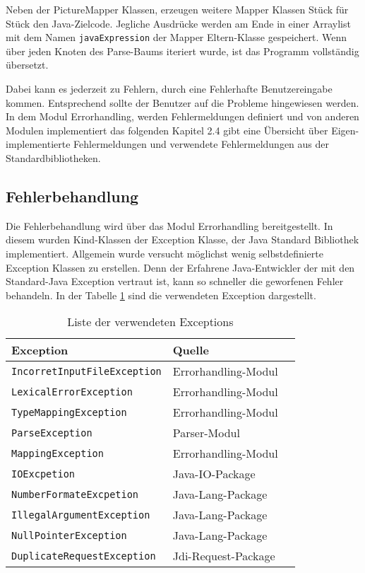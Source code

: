 Neben der PictureMapper Klassen, erzeugen weitere Mapper Klassen Stück für Stück den Java-Zielcode. 
Jegliche Ausdrücke werden am Ende in einer Arraylist mit dem Namen \verb+javaExpression+ der Mapper Eltern-Klasse  gespeichert.
Wenn über jeden Knoten des Parse-Baums iteriert wurde, ist das Programm vollständig übersetzt.


Dabei kann es jederzeit zu Fehlern, durch eine Fehlerhafte Benutzereingabe kommen.
Entsprechend sollte der Benutzer auf die Probleme hingewiesen werden.
In dem Modul Errorhandling, werden Fehlermeldungen definiert und von anderen Modulen implementiert das folgenden Kapitel 2.4 gibt eine Übersicht über Eigen-implementierte Fehlermeldungen und verwendete Fehlermeldungen aus der Standardbibliotheken.

\pagebreak

\subsection{Fehlerbehandlung}
Die Fehlerbehandlung wird über das Modul Errorhandling bereitgestellt.
In diesem wurden Kind-Klassen der Exception Klasse, der Java Standard Bibliothek implementiert.
Allgemein wurde versucht möglichst wenig selbstdefinierte Exception Klassen zu erstellen.
Denn der Erfahrene Java-Entwickler der mit den Standard-Java Exception vertraut ist, kann so schneller die geworfenen Fehler behandeln. In der Tabelle \ref{tab:exceptiontabelle} sind die verwendeten Exception dargestellt.

\begin{table}[h]
	\centering
	
	\label{tab:exceptiontabelle}
\begin{tabular}[h]{|l|l|l|}
	\hline
	\textbf{Exception} & \textbf{Quelle}  \\
	\hline
	\verb+IncorretInputFileException+ & Errorhandling-Modul  \\
	\hline
	\verb+LexicalErrorException+ & Errorhandling-Modul  \\
	\hline
	\verb+TypeMappingException+ & Errorhandling-Modul \\
	\hline
	\verb+ParseException+ & Parser-Modul \\
	\hline
	\verb+MappingException+ & Errorhandling-Modul \\
	\hline
	\verb+IOExcpetion+ & Java-IO-Package \\
	\hline
	\verb+NumberFormateExcpetion+ & Java-Lang-Package \\
	\hline
	\verb+IllegalArgumentException+ & Java-Lang-Package \\
	\hline
	\verb+NullPointerException+ & Java-Lang-Package \\
	\hline
	\verb+DuplicateRequestException+ & Jdi-Request-Package \\
	\hline
	
\end{tabular}
\caption{Liste der verwendeten Exceptions}
\end{table}

